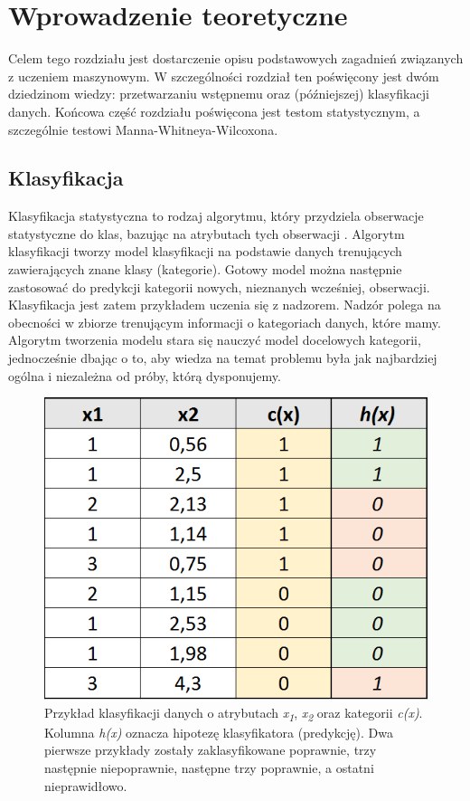 \documentclass[../thesis.tex]{subfiles}
\begin{document}
\pagestyle{plain}
\chapter{Wprowadzenie teoretyczne}

Celem tego rozdziału jest dostarczenie opisu podstawowych zagadnień związanych z uczeniem maszynowym. W szczególności rozdział ten poświęcony jest dwóm dziedzinom wiedzy: przetwarzaniu wstępnemu oraz (późniejszej) klasyfikacji danych. Końcowa część rozdziału poświęcona jest testom statystycznym, a szczególnie testowi Manna-Whitneya-Wilcoxona.

\section{Klasyfikacja}

Klasyfikacja statystyczna to rodzaj algorytmu, który przydziela obserwacje statystyczne do klas, bazując na atrybutach tych obserwacji \cite{def_classification}. Algorytm klasyfikacji tworzy model klasyfikacji na podstawie danych trenujących zawierających znane klasy (kategorie). Gotowy model można następnie zastosować  do predykcji kategorii nowych, nieznanych wcześniej, obserwacji. Klasyfikacja jest zatem przykładem uczenia się z nadzorem. Nadzór polega na obecności w zbiorze trenującym informacji o kategoriach danych, które mamy. Algorytm tworzenia modelu stara się nauczyć model docelowych kategorii, jednocześnie dbając o to, aby wiedza na temat problemu była jak najbardziej ogólna i niezależna od próby, którą dysponujemy.

\begin{figure}[h]
\centering
\includegraphics[height=.2\textheight]{classification.png}
\caption{Przykład klasyfikacji danych o atrybutach \emph{x\textsubscript{1}}, \emph{x\textsubscript{2}} oraz kategorii \emph{c(x)}. Kolumna \emph{h(x)} oznacza hipotezę klasyfikatora (predykcję). Dwa pierwsze przykłady zostały zaklasyfikowane poprawnie, trzy następnie niepoprawnie, następne trzy poprawnie, a ostatni nieprawidłowo. }
\label{classification:basic}
\end{figure}
\end{document}
